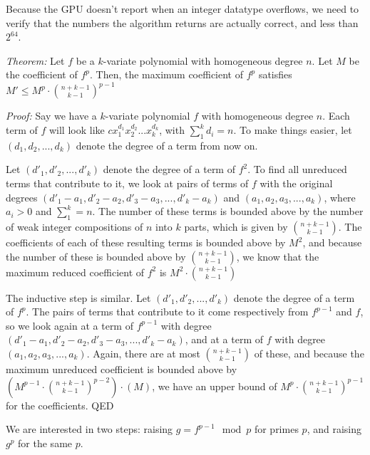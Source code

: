 \documentclass{article}
\begin{document}
Because the GPU doesn't report when an integer datatype overflows, we need to verify that the numbers the algorithm returns are actually correct, and less than $2^{64}$.

\textit{Theorem: } Let $f$ be a $k$-variate polynomial with homogeneous degree $n$. Let $M$ be the coefficient of $f^p$. Then, the maximum coefficient of $f^p$ satisfies $M' \le M^p \cdot \binom{n + k - 1}{k - 1}^{p-1}$

\textit{Proof: } Say we have a $k$-variate polynomial $f$ with homogeneous degree $n$. Each term of $f$ will look like $cx_{1}^{d_1}x_{2}^{d_2}...x_{k}^{d_k}$, with $ \sum_{1}^{k} d_i = n$. To make things easier, let $(d_1, d_2, ... , d_k)$ denote the degree of a term from now on.

Let $(d'_1, d'_2, ... , d'_k)$ denote the degree of a term of $f^2$. To find all unreduced terms that contribute to it, we look at pairs of terms of $f$ with the original degrees $(d'_1 - a_1, d'_2 - a_2, d'_3 - a_3, ... , d'_k - a_k)$ and $(a_1, a_2, a_3, ... , a_k)$, where $a_i > 0$ and $\sum_{1}^{k} = n$. The number of these terms is bounded above by the number of weak integer compositions of $n$ into $k$ parts, which is given by $\binom{n + k - 1}{k - 1}$. The coefficients of each of these resulting terms is bounded above by $M^2$, and because the number of these is bounded above by $\binom{n + k - 1}{k - 1}$, we know that the maximum reduced coefficient of $f^2$ is $M^2 \cdot \binom{n + k - 1}{k - 1}$

The inductive step is similar. Let $(d'_1, d'_2, ... , d'_k)$ denote the degree of a term of $f^p$. The pairs of terms that contribute to it come respectively from $f^{p - 1}$ and $f$, so we look again at a term of $f^{p - 1}$ with degree $(d'_1 - a_1, d'_2 - a_2, d'_3 - a_3, ... , d'_k - a_k)$, and at a term of $f$ with degree $(a_1, a_2, a_3, ... , a_k)$. Again, there are at most $\binom{n + k - 1}{k - 1}$ of these, and because the maximum unreduced coefficient is bounded above by $\left(M^{p - 1} \cdot \binom{n + k - 1}{k - 1} ^ {p - 2}\right) \cdot (M)$, we have an upper bound of $M^p \cdot \binom{n + k - 1}{k - 1}^{p-1}$ for the coefficients. QED

We are interested in two steps: raising $g = f^{p - 1}\mod p$ for primes $p$, and raising $g ^ p$ for the same $p$.
\end{document}
